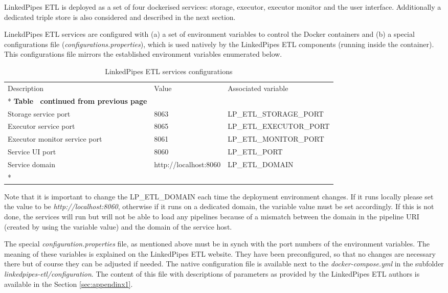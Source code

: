 	LinkedPipes ETL is deployed as a set of four dockerised services: storage, executor, executor monitor and the user interface. Additionally a dedicated triple store is also considered and described in the next section. 
	
	LinekdPipes ETL services are configured with  (a) a set of environment variables to control the Docker containers and (b) a special configurations file (\textit{configurations.properties}), which is used natively by the LinkedPipes ETL components (running inside the container). This configurations file mirrors the  established environment variables enumerated below.

	
	\begin{longtable}[c]{@{}p{5cm}p{4cm}l@{}}
		\toprule
		Description & Value & Associated variable \\* \midrule
		\endfirsthead
		\multicolumn{3}{c}%
		{{\bfseries Table \thetable\ continued from previous page}} \\
		\endhead
		\bottomrule
		\endfoot
		\endlastfoot
		Storage service port & 8063 & LP\_ETL\_STORAGE\_PORT \\		
		Executor service port & 8065 & LP\_ETL\_EXECUTOR\_PORT \\
		Executor monitor service port & 8061 & LP\_ETL\_MONITOR\_PORT \\		
		Service UI port & 8060 & LP\_ETL\_PORT \\
		Service domain & http://localhost:8060 & LP\_ETL\_DOMAIN \\* \bottomrule
		\caption{LinkedPipes ETL services configurations}
		\label{tab:my-table5}\\
	\end{longtable}
	
	Note that it is important to change the LP\_ETL\_DOMAIN each time the deployment environment changes. If it runs locally please set the value to be \textit{http://localhost:8060}, otherwise if it runs on a dedicated domain, the variable value must be set accordingly. If this is not done, the services will run but will not be able to load any pipelines because of a mismatch between the domain in the pipeline URI (created by using the variable value) and the domain of the service host. 
	
	The special \textit{configuration.properties} file, as mentioned above must be in synch with the port numbers of the environment variables. The meaning of these variables is explained on the LinkedPipes ETL website. They have been preconfigured, so that no changes are necessary there but of course they can be adjusted if needed. The native configuration file is available next to the \textit{docker-compose.yml} in the subfolder \textit{linkedpipes-etl/configuration}. The content of this file with descriptions of parameters as provided by the LinkedPipes ETL authors is available in the Section \ref{sec:appendinx1}. 	
	
